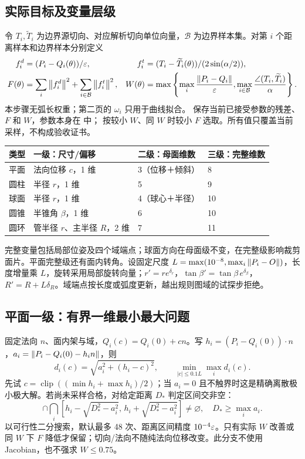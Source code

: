 \subsection{实际目标及变量层级}
令 $T_i,\widetilde T_i$ 为边界源切向、对应解析切向单位向量，$\mathcal B$ 为边界样本集。对第 $i$ 个距离样本和边界样本分别定义
\begin{align}
 f_i^d&=(P_i-Q_i(\theta))/\varepsilon,& f_i^t&=(T_i-\widetilde T_i(\theta))/(2\sin(\alpha/2)),\\
 F(\theta)&=\sum_i\left\lVert f_i^d\right\rVert^2+\sum_{i\in\mathcal B}\left\lVert f_i^t\right\rVert^2,&
 W(\theta)&=\max\left\{\max_i\frac{\left\lVert P_i-Q_i\right\rVert}{\varepsilon},
 \max_{i\in\mathcal B}\frac{\angle(T_i,\widetilde T_i)}\alpha\right\}.
\end{align}
本步骤无弧长权重；第二页的 $\omega_i$ 只用于曲线拟合。 保存当前已接受参数的残差、$F$ 和 $W$，参数本身在  中； 按较小 $W$、同 $W$ 时较小 $F$ 选取。所有值只覆盖当前采样，不构成验收证书。

\par{\small\begin{tabularx}{\linewidth}{@{}l Y l l@{}}\toprule
类型 & 一级：尺寸/偏移 & 二级：母面维数 & 三级：完整维数\\\midrule
平面 & 法向位移 $c$，1 维 & 3（位移＋倾斜） & 8\\
圆柱 & 半径 $r$，1 维 & 5 & 9\\
球面 & 半径 $r$，1 维 & 4（球心＋半径） & 10\\
圆锥 & 半锥角 $\beta$，1 维 & 6 & 10\\
圆环 & 管半径 $r$、主半径 $R$，2 维 & 7 & 11\\\bottomrule
\end{tabularx}}
完整变量包括局部位姿及四个域端点；球面方向在母面级不变，在完整级影响裁剪面片。平面完整级还有面内转角。设固定尺度 $L=\max(10^{-8},\max_i\left\lVert P_i-O\right\rVert)$，长度增量乘 $L$，旋转采用局部旋转向量；$r'=r e^{\delta_r}$，$\tan\beta'=\tan\beta\,e^{\delta_\beta}$，$R'=R+L\delta_R$。域端点按长度或弧度更新，越出规则图域的试探步拒绝。

\subsection{平面一级：有界一维最小最大问题}
固定法向 $n$、面内架与域，$Q_i(c)=Q_i(0)+cn$。写 $h_i=(P_i-Q_i(0))\cdot n$，$a_i=\left\lVert P_i-Q_i(0)-h_in\right\rVert$，则
\begin{equation}
 d_i(c)=\sqrt{a_i^2+(h_i-c)^2},\qquad \min_{|c|\le0.1L}\max_i d_i(c).
\end{equation}
先试 $c=\operatorname{clip}((\min h_i+\max h_i)/2)$；当 $a_i=0$ 且不触界时这是精确离散极小极大解。若尚未采样合格，对给定距离 $D_*$ 判定区间交非空：
\begin{equation}
 [-0.1L,0.1L]\cap\bigcap_i
 [h_i-\sqrt{D_*^2-a_i^2},\,h_i+\sqrt{D_*^2-a_i^2}]\ne\varnothing,
 \quad D_*\ge\max_i a_i.
\end{equation}
以可行性二分搜索，默认最多 48 次、距离区间精度 $10^{-4}\varepsilon$。只有实际 $W$ 改善或同 $W$ 下 $F$ 降低才保留；切向/法向不随纯法向位移改变。此分支不使用 Jacobian，也不强求 $W\le0.75$。


